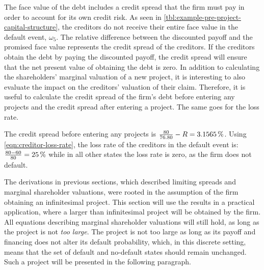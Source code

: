 \documentclass[main.tex]{subfiles}
\begin{document}
    The face value of the debt includes a credit spread that the firm must pay in order to account for its own credit risk.
    As seen in \cref{tbl:example-pre-project-capital-structure},
    the creditors do not receive their entire face value in the default event, $\omega_5$.
    The relative difference between the discounted payoff and the promised face value
    represents the credit spread of the creditors.
    If the creditors obtain the debt by paying the discounted payoff,
    the credit spread will ensure that the net present value of obtaining the debt is zero.
    In addition to calculating the shareholders' marginal valuation of a new project,
    it is interesting to also evaluate the impact on the creditors' valuation of their claim. 
    Therefore, it is useful to calculate the credit spread of the firm's debt 
    before entering any projects and the credit spread after entering a project.
    The same goes for the loss rate.

    The credit spread before entering any projects is 
    $\frac{\num{80}}{\num{76.80}} - \grossrfrate = \pct{0.031565}$.
    Using \cref{eqn:creditor-loss-rate}, the loss rate of the creditors in the default event is:
    $\frac{\num{80}-\num{60}}{\num{80}} = \pct{0.25}$
    while in all other states the loss rate is zero, as the firm does not default.

    The derivations in previous sections, 
    which described limiting spreads and marginal shareholder valuations, 
    were rooted in the assumption of the firm obtaining an infinitesimal project.
    This section will use the results in a practical application,
    where a larger than infinitesimal project will be obtained by the firm.
    All equations describing marginal shareholder valuations will still hold,
    as long as the project is not \textit{too large}.
    The project is not too large as long as its payoff and financing does not 
    alter its default probability, which, in this discrete setting, means
    that the set of default and no-default states should remain unchanged.
    Such a project will be presented in the following paragraph.
    
\end{document}
